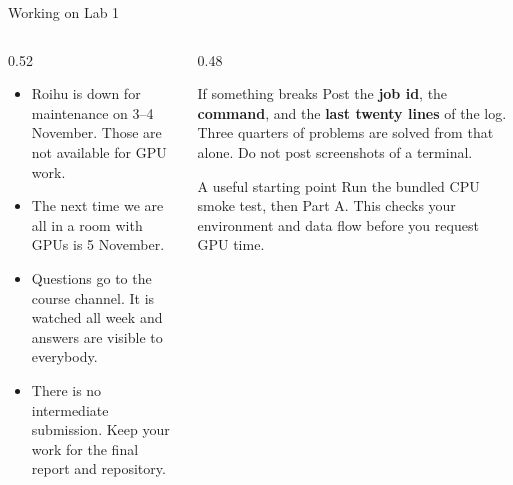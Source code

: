 \documentclass[aspectratio=169,10pt]{beamer}
\begin{document}
\begin{frame}{Working on Lab 1}
  \begin{columns}[T]
    \begin{column}{0.52\textwidth}
      \begin{itemize}
        \item \alert{Roihu is down for maintenance on 3--4 November.} Those are
          not available for GPU work.
        \item {} The next time we are
          all in a room with GPUs is 5 November.
        \item Questions go to the course channel. It is watched all week and
          answers are visible to everybody.
        \item There is no intermediate submission. Keep your work for the final
          report and repository.
      \end{itemize}
    \end{column}
    \begin{column}{0.48\textwidth}
      \begin{block}{If something breaks}
        \small
        Post the \textbf{job id}, the \textbf{command}, and the \textbf{last
        twenty lines} of the log. Three quarters of problems are solved from
        that alone.
        \vspace{0.4em}
        Do not post screenshots of a terminal.
      \end{block}
      \vspace{0.3em}
      \begin{block}{A useful starting point}
        Run the bundled CPU smoke test, then Part A. This checks your
        environment and data flow before you request GPU time.
      \end{block}
    \end{column}
  \end{columns}
\end{frame}

\end{document}
